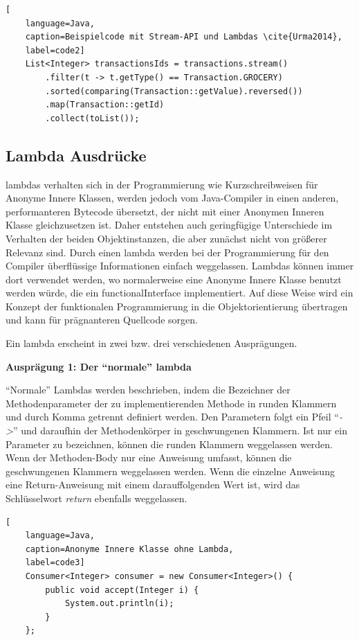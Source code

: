 \begin{lstlisting}[
    language=Java,
    caption=Beispielcode mit Stream-API und Lambdas \cite{Urma2014},
    label=code2]
	List<Integer> transactionsIds = transactions.stream()
		.filter(t -> t.getType() == Transaction.GROCERY)
		.sorted(comparing(Transaction::getValue).reversed())
		.map(Transaction::getId)
		.collect(toList());
\end{lstlisting}  
\subsection{Lambda Ausdrücke} \label{sec:javaLambda}
\glspl{lambda} verhalten sich in der Programmierung wie Kurzschreibweisen für Anonyme Innere Klassen, werden jedoch vom Java-Compiler in einen anderen, performanteren Bytecode übersetzt, der nicht mit einer Anonymen Inneren Klasse gleichzusetzen ist. Daher entstehen auch geringfügige Unterschiede im Verhalten der beiden Objektinstanzen, die aber zunächst nicht von größerer Relevanz sind. Durch einen \gls{lambda} werden bei der Programmierung für den Compiler überflüssige Informationen einfach weggelassen. Lambdas können immer dort verwendet werden, wo normalerweise eine Anonyme Innere Klasse benutzt werden würde, die ein \gls{functionalInterface} implementiert. Auf diese Weise wird ein Konzept der funktionalen Programmierung in die Objektorientierung übertragen und kann für prägnanteren Quellcode sorgen.

Ein \gls{lambda} erscheint in zwei bzw. drei verschiedenen Ausprägungen.

\textbf{Ausprägung 1: Der \enquote{normale} \gls{lambda}}

\enquote{Normale} Lambdas werden beschrieben, indem die Bezeichner der Methodenparameter der zu implementierenden Methode in runden Klammern und durch Komma getrennt definiert werden. Den Parametern folgt ein Pfeil \enquote{\textit{->}} und daraufhin der Methodenkörper in geschwungenen Klammern. Ist nur ein Parameter zu bezeichnen, können die runden Klammern weggelassen werden. Wenn der Methoden-Body nur eine Anweisung umfasst, können die geschwungenen Klammern weggelassen werden. Wenn die einzelne Anweisung eine Return-Anweisung mit einem darauffolgenden Wert ist, wird das Schlüsselwort \textit{return} ebenfalls weggelassen. \cite{OracleLambda}

\begin{lstlisting}[
    language=Java,
    caption=Anonyme Innere Klasse ohne Lambda,
    label=code3]
	Consumer<Integer> consumer = new Consumer<Integer>() {
		public void accept(Integer i) {
			System.out.println(i);
		}
	};
\end{lstlisting}  

